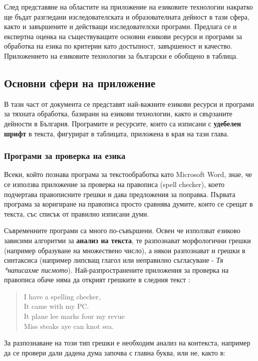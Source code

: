 \documentclass[]{../../metanetpaper}
\begin{document}
\begin{multicols}{2}
След представяне на областите на приложение на езиковите технологии накратко ще бъдат разгледани изследователската и образователната дейност в тази сфера, както и завършените и действащи изследователски програми. Предлага се  и експертна оценка на съществуващите основни езикови ресурси и програми за обработка на езика по критерии като достъпност, завършеност и качество. Приложението на езиковите технологии за български е обобщено в таблица.

\subsection{Основни сфери на приложение}

В тази част от документа се представят най-важните езикови ресурси и програми за тяхната обработка, базирани на езикови технологии, както и свързаните дейности в България. Програмите и ресурсите, които са изписани с \textbf{удебелен шрифт} в текста, фигурират в таблицата, приложена в края на тази глава.  

\subsubsection{Програми за проверка на езика}

Всеки, който познава програма за текстообработка като Microsoft Word, знае, че се използва приложение за проверка на правописа (spell checker), което подчертава правописните грешки и дава предложения за поправка. Първата програма за коригиране на правописа просто сравнява думите, които се срещат в текста, със списък от правилно изписани думи. 

Съвременните програми са много по-съвършени. Освен че използват
езиково зависими алгоритми за \textbf{анализ на текста}, те разпознават
морфологични грешки (например образуване на множествено число), а
някои разпознават и грешки в синтаксиса (например липсващ глагол или
неправилно съгласуване - {\it Тя *написахме
  писмото}). Най-разпространените приложения за проверка на правописа
обаче няма да открият грешките в следния текст \cite{zar1}: 

\begin{quote}
  I have a spelling checker,\\
  It came with my PC.\\
  It plane lee marks four my revue\\
  Miss steaks aye can knot sea.
\end{quote}

За разпознаване на този тип грешки е необходим анализ на контекста, например да се провери дали дадена дума започва с главна буква, или не, както в: 


\end{multicols}
\end{document}
